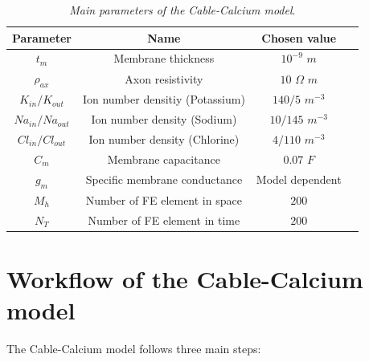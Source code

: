 \documentclass[12pt, a4paper]{report}
\begin{document}
\begin{table}[H]
	\begin{center}
		\begin{tabular}{ |c|c|c|c| } 
			\hline
			\textbf{Parameter} & \textbf{Name} & \textbf{Chosen value} \\
			\hline
			$t_m$ & Membrane thickness & $10^{-9}$ $ m$ \\ 
			\hline
			$\rho_{ax}$ & Axon resistivity & $10$ $\Omega$ $ m$ \\
			\hline
			$K_{in}/K_{out}$ & Ion number densitiy (Potassium) & $140/5$ $m^{-3}$ \\
			\hline
			$Na_{in}/Na_{out}$ & Ion number density (Sodium) & $10/145$ $m^{-3}$ \\
			\hline
			$Cl_{in}/Cl_{out}$ & Ion number density (Chlorine) & $4/110$ $m^{-3}$ \\
			\hline
			$C_m$ & Membrane capacitance & $0.07$ $F$ \\
			\hline
			$g_m$ & Specific membrane conductance & Model dependent \\
			\hline
			$M_h$ & Number of FE element in space & $200$ \\
			\hline
			$N_T$ & Number of FE element in time & $200$ \\
			
			
			\hline
		\end{tabular}
		
	\end{center}
	\caption{\textit{Main parameters of the Cable-Calcium model}. \cite{38}} \label{param}
\end{table}

\section{Workflow of the Cable-Calcium model}


The Cable-Calcium model follows three main steps:
\end{document}
